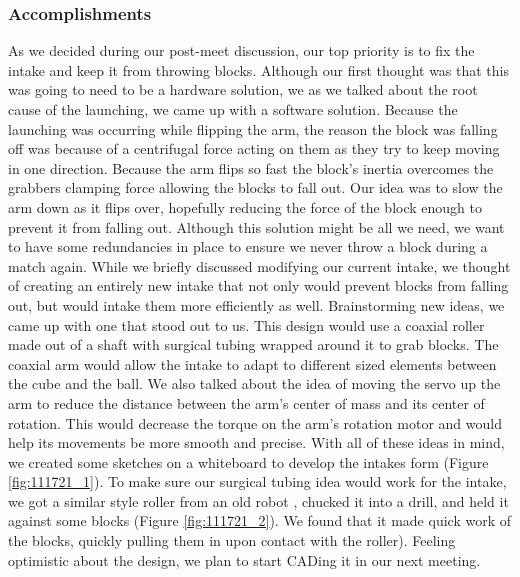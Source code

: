 \subsubsection*{Accomplishments}
As we decided during our post-meet discussion, our top priority is to fix the intake and keep it from throwing blocks. Although our first thought was that this was going to need to be a hardware solution, we as we talked about the root cause of the launching, we came up with a software solution. Because the launching was occurring while flipping the arm, the reason the block was falling off was because of a centrifugal force acting on them as they try to keep moving in one direction. Because the arm flips so fast the block’s inertia overcomes the grabbers clamping force allowing the blocks to fall out. Our idea was to slow the arm down as it flips over, hopefully reducing the force of the block enough to prevent it from falling out.
Although this solution might be all we need, we want to have some redundancies in place to ensure we never throw a block during a match again. While we briefly discussed modifying our current intake, we thought of creating an entirely new intake that not only would prevent blocks from falling out, but would intake them more efficiently as well. Brainstorming new ideas, we came up with one that stood out to us. This design would use a coaxial roller made out of a shaft with surgical tubing wrapped around it to grab blocks. The coaxial arm would allow the intake to adapt to different sized elements between the cube and the ball. We also talked about the idea of moving the servo up the arm to reduce the distance between the arm’s center of mass and its center of rotation. This would decrease the torque on the arm’s rotation motor and would help its movements be more smooth and precise. With all of these ideas in mind, we created some sketches on a whiteboard to develop the intakes form (Figure \ref{fig:111721_1}).
To make sure our surgical tubing idea would work for the intake, we got a similar style roller from an old robot  , chucked it into a drill, and held it against some blocks (Figure \ref{fig:111721_2}). We found that it made quick work of the blocks, quickly pulling them in upon contact with the roller). Feeling optimistic about the design, we plan to start CADing it in our next meeting. 



